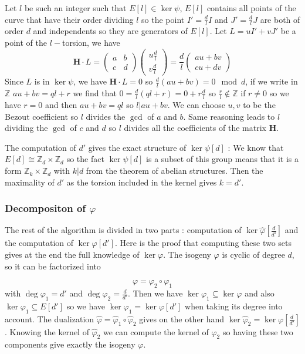\documentclass[12pt,a4paper]{article}
\begin{document}
			Let $l$ be such an integer such that $E[l]\in\ker\psi$, $E[l]$ contains all points of the curve
			that have their order dividing $l$ so the point $I'=\frac{d}{l}I$ and $J'=\frac{d}{l}J$
			are both of order $d$ and independents so they are generators of $E[l]$.
			Let $L=uI'+vJ'$ be a point of the $l-$torsion, we have \[
				\mathbf H\cdot L=\begin{pmatrix} a & b \\ c & d \end{pmatrix}\begin{pmatrix} u\frac{d}{l} \\ 
			v\frac{d}{l}\end{pmatrix} = \frac{d}{l} \begin{pmatrix} au+bv \\ cu+dv \end{pmatrix} 
			\] 
			Since $L$ is in $\ker\psi$, we have $\mathbf H\cdot L=0$ so  $\frac{d}{l}(au+bv)=0\mod d$, if we
			write in $\mathbb Z$  $au+bv = ql+r$  we find that $0=\frac{d}{l}(ql+r)=0+r\frac{d}{l}$ so
			$\frac{r}{l}\not\in\mathbb{Z}$ if $r\neq 0$ so we have $r=0$ and then $au+bv = ql$ so 
			$l|au+bv$. We can choose  $u,v$ to be the Bezout coefficient so $l$ divides the $\gcd$ of $a$ and
			$b$. Same reasoning leads to  $l$ dividing the $\gcd$ of $c$ and $d$ so  $l$ divides all the
			coefficients of the matrix $\mathbf H$.

			The computation of $d'$ gives the exact structure of $\ker\psi[d]$ : We know that
			$E[d]\cong \mathbb Z_d \times \mathbb Z_d$ so the fact $\ker\psi[d]$ is a subset of this group means
			that it is a form $\mathbb Z_k \times \mathbb Z_d$ with  $k|d$ from the theorem of abelian
			structures. Then the maximality of $d'$ as the torsion included in the kernel gives $k=d'$.

			\subsubsection{Decompositon of $\varphi$ }
			
			The rest of the algorithm is divided in two parts : computation of 
			$\ker\widehat\varphi[\frac{d}{d'}]$ and the computation of $\ker\varphi[d']$. Here is the proof
			that computing these two sets gives at the end the full knowledge of $\ker\varphi$.
			The isogeny $\varphi$ is cyclic of degree $d$, so it can be factorized into 

			$$\varphi=\varphi_2\circ\varphi_1$$ with  $\deg\varphi_1 = d'$ and  $\deg\varphi_2 = \frac{d}{d'}$.
			Then we have $\ker\varphi_1\subseteq\ker\varphi$ and also $\ker\varphi_1\subseteq E[d']$ 
			so we have  $\ker\varphi_1 =\ker\varphi[d']$ when taking its degree into account.
			The dualization $\widehat\varphi = \widehat\varphi_1\circ\widehat\varphi_2$ gives on the other
			hand $\ker\widehat\varphi_2=\ker\varphi[\frac{d}{d'}]$. Knowing the kernel of $\widehat\varphi_2$
			we can compute the kernel of $\varphi_2$ so having these two components give exactly the isogeny
			$\varphi$.
\end{document}
